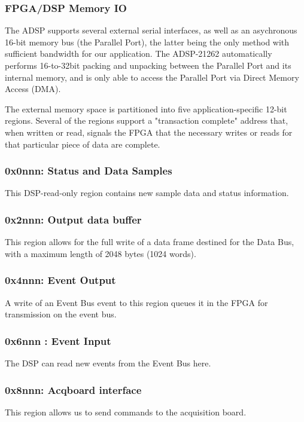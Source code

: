 \documentclass{article}
\begin{document}
\subsubsection{FPGA/DSP Memory IO}

 The ADSP supports several external serial interfaces, as well
as an asychronous 16-bit memory bus (the Parallel Port), the latter
being the only method with sufficient bandwidth for our application.
The ADSP-21262 automatically performs 16-to-32bit packing and
unpacking between the Parallel Port and its internal memory, and is
only able to access the Parallel Port via Direct Memory Access (DMA).


 The external memory space is partitioned into five
application-specific 12-bit regions. Several of the regions support a
"transaction complete" address that, when written or read, signals the
FPGA that the necessary writes or reads for that particular piece of
data are complete.  

\subsubsection{0x0nnn: Status and  Data  Samples}
This DSP-read-only region contains new sample data and status
information.



\subsubsection{0x2nnn: Output data buffer} 
 This region allows for the full write of a data frame destined
for the Data Bus, with a maximum length of 2048 bytes (1024
words).


\subsubsection{0x4nnn: Event Output} 

A write of an Event Bus event to this region queues it in the FPGA for
transmission on the event bus.


\subsubsection{0x6nnn : Event Input}
The DSP can read new events from the Event Bus here. 


\subsubsection{0x8nnn: Acqboard interface}
This region allows us to send commands to the acquisition board. 

\end{document}
